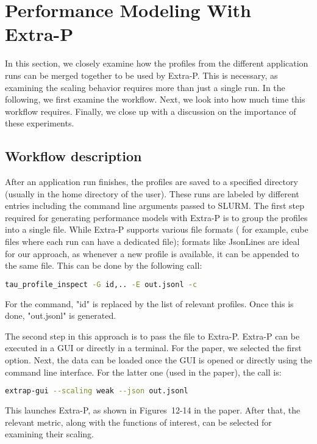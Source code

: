 \section{Performance Modeling With Extra-P}
\label{sec:extra-p}
In this section, we closely examine how the profiles from the different application runs 
can be merged together to be used by Extra-P. This is necessary, as examining the scaling 
behavior requires more than just a single run. In the following, we first examine the workflow. 
Next, we look into how much time this workflow requires. Finally, we close up with a discussion 
on the importance of these experiments. 

\subsection{Workflow description}
After an application run finishes, the profiles are saved to a specified directory (usually in 
the home directory of the user). 
These runs are labeled by different entries including the command line arguments passed to SLURM. 
The first step required for generating performance models with Extra-P is to group the 
profiles into a single file. While Extra-P supports various file formats ( 
for example, cube files where each run can have a dedicated file); formats like JsonLines 
are ideal for our approach, as whenever a new profile is available, it can be appended to the same 
file. This can be done by the following call: 
\begin{lstlisting}[language=bash]
tau_profile_inspect -G id,.. -E out.jsonl -c 
\end{lstlisting}
For the command, "id" is replaced by the list of relevant profiles. Once this is done, "out.jsonl" 
is generated. 

The second step in this approach is to pass the file to Extra-P. 
Extra-P can be executed in a GUI or directly in a terminal. For the paper, 
we selected the first option. Next, the data can be loaded once the GUI is opened or 
directly using the command line interface. For the latter one (used in the paper), the call is:
\begin{lstlisting}[language=bash]
extrap-gui --scaling weak --json out.jsonl
\end{lstlisting}

This launches Extra-P, as shown in Figures~12-14 in the paper. After that, the relevant 
metric, along with the functions of interest, can be selected for examining their scaling. 

